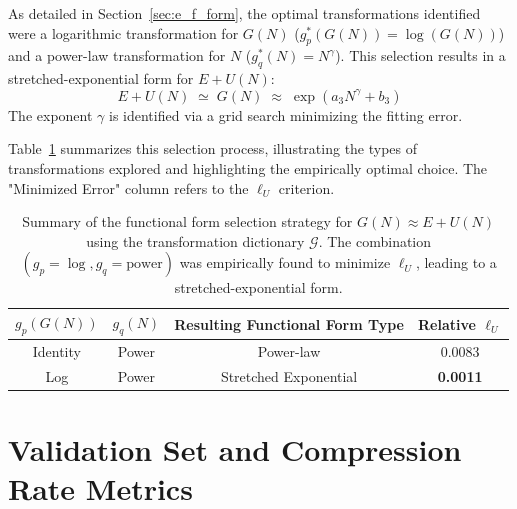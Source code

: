 \documentclass{article}
\begin{document}
As detailed in Section~\ref{sec:e_f_form}, the optimal transformations identified were a logarithmic transformation for $G(N)$ ($g_p^*(G(N)) = \log(G(N))$) and a power-law transformation for $N$ ($g_q^*(N) = N^{\gamma}$). This selection results in a stretched-exponential form for $E+U(N)$:
\begin{equation}
E+U(N) \;\simeq\; G(N) \;\approx\; \exp(a_3 N^{\gamma} + b_3)
\end{equation}
The exponent $\gamma$ is identified via a grid search minimizing the fitting error.

Table~\ref{tab:u_transform_selection} summarizes this selection process, illustrating the types of transformations explored and highlighting the empirically optimal choice. The "Minimized Error" column refers to the $\ell_U$ criterion.

\begin{table}[!htbp]
\centering
\caption{Summary of the functional form selection strategy for $G(N) \approx E+U(N)$ using the transformation dictionary $\mathcal{G}$. The combination $(g_p=\log, g_q=\text{power})$ was empirically found to minimize $\ell_U$, leading to a stretched-exponential form.}
\label{tab:u_transform_selection}
\begin{tabular}{cccc}
\toprule
$g_p(G(N))$ & $g_q(N)$ & Resulting Functional Form Type & Relative $\ell_U$ \\
\midrule
Identity   & Power    & Power-law      & 0.0083     \\
Log        & Power    & Stretched Exponential & \textbf{0.0011} \\
\bottomrule
\end{tabular}
\end{table}



\section{Validation Set and Compression Rate Metrics}
\label{app:validation_compression}
\end{document}
